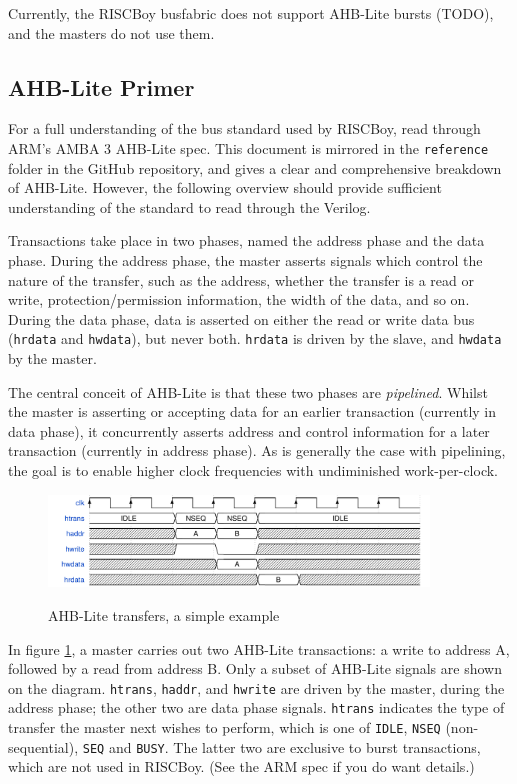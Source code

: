 \documentclass[notitlepage]{article}
\begin{document}
Currently, the RISCBoy busfabric does not support AHB-Lite bursts (TODO), and the masters do not use them.

\subsection{AHB-Lite Primer}

For a full understanding of the bus standard used by RISCBoy, read through ARM's AMBA 3 AHB-Lite spec. This document is mirrored in the {\tt reference} folder in the GitHub repository, and gives a clear and comprehensive breakdown of AHB-Lite. However, the following overview should provide sufficient understanding of the standard to read through the Verilog.

Transactions take place in two phases, named the address phase and the data phase. During the address phase, the master asserts signals which control the nature of the transfer, such as the address, whether the transfer is a read or write, protection/permission information, the width of the data, and so on. During the data phase, data is asserted on either the read or write data bus ({\tt hrdata} and {\tt hwdata}), but never both. {\tt hrdata} is driven by the slave, and {\tt hwdata} by the master.

The central conceit of AHB-Lite is that these two phases are {\it pipelined}. Whilst the master is asserting or accepting data for an earlier transaction (currently in data phase), it concurrently asserts address and control information for a later transaction (currently in address phase). As is generally the case with pipelining, the goal is to enable higher clock frequencies with undiminished work-per-clock.

\begin{figure}[H]
\centering
\caption{AHB-Lite transfers, a simple example}
\includegraphics[width=0.9\textwidth]{waves/ahbl_basic.pdf}
\label{diagram:ahbl_basic}
\end{figure}

In figure \ref{diagram:ahbl_basic}, a master carries out two AHB-Lite transactions: a write to address A, followed by a read from address B. Only a subset of AHB-Lite signals are shown on the diagram. {\tt htrans}, {\tt haddr}, and {\tt hwrite} are driven by the master, during the address phase; the other two are data phase signals. {\tt htrans} indicates the type of transfer the master next wishes to perform, which is one of {\tt IDLE}, {\tt NSEQ} (non-sequential), {\tt SEQ} and {\tt BUSY}. The latter two are exclusive to burst transactions, which are not used in RISCBoy. (See the ARM spec if you do want details.)
\end{document}
